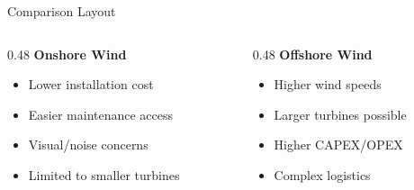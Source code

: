 \begin{frame}{Comparison Layout}
    \begin{columns}[T]
        \begin{column}{0.48\textwidth}
            \textbf{Onshore Wind}
            \begin{itemize}
                \item Lower installation cost
                \item Easier maintenance access
                \item Visual/noise concerns
                \item Limited to smaller turbines
            \end{itemize}
        \end{column}
        \begin{column}{0.48\textwidth}
            \textbf{Offshore Wind}
            \begin{itemize}
                \item Higher wind speeds
                \item Larger turbines possible
                \item Higher CAPEX/OPEX
                \item Complex logistics
            \end{itemize}
        \end{column}
    \end{columns}
\end{frame}
